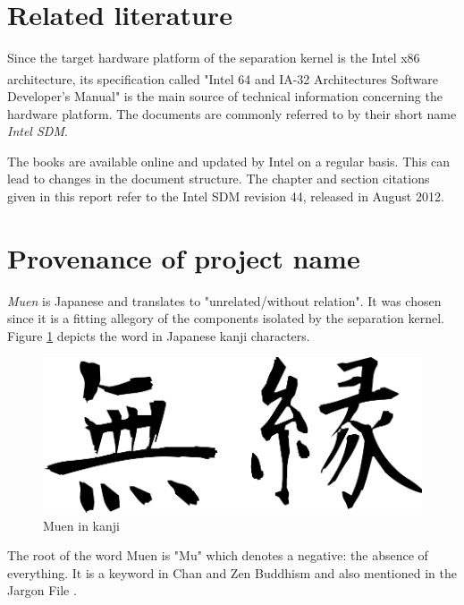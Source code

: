 \section{Related literature}
Since the target hardware platform of the separation kernel is the Intel x86
architecture, its specification called "Intel\textsuperscript{\textregistered}
64 and IA-32 Architectures Software Developer's Manual"
\cite{IntelSDM} is the main source of technical information
concerning the hardware platform. The documents are commonly referred to by
their short name \emph{Intel SDM}.

The books are available online and updated by Intel on a regular basis. This
can lead to changes in the document structure. The chapter and section
citations given in this report refer to the Intel SDM revision 44, released in
August 2012.

\section{Provenance of project name}
\emph{Muen} is Japanese and translates to "unrelated/without relation". It was
chosen since it is a fitting allegory of the components isolated by the
separation kernel. Figure \ref{fig:muen} depicts the word in Japanese kanji
characters.

\begin{figure}[h]
	\centering
	\includegraphics[scale=0.4]{images/muen.pdf}
	\caption{Muen in kanji}
	\label{fig:muen}
\end{figure}

The root of the word Muen is "Mu" which denotes a negative: the absence of
everything. It is a keyword in Chan and Zen Buddhism and also mentioned in the
Jargon File \cite{jargonfile}.

